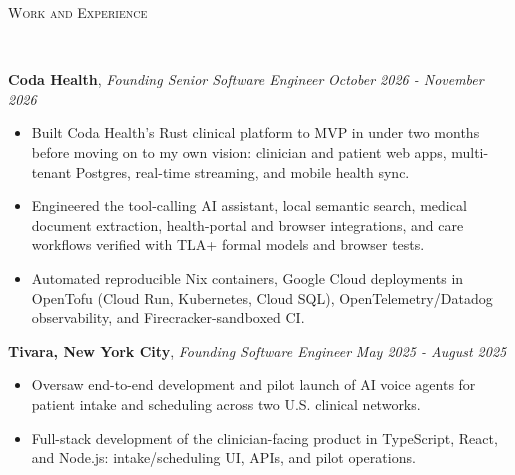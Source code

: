 \documentclass[8pt]{article}
\newenvironment{changemargin}[2]{%
  \begin{list}{}{%
    \setlength{\topsep}{0pt}%
    \setlength{\leftmargin}{#1}%
    \setlength{\rightmargin}{#2}%
    \setlength{\listparindent}{\parindent}%
    \setlength{\itemindent}{\parindent}%
    \setlength{\parsep}{0pt}%
    \setlength{\itemsep}{-2pt}%
  }%
  \item[]}{\end{list}
}
\newcommand{\lineover}{
	\begin{changemargin}{-0.05in}{-0.05in}
		\vspace*{-10pt}
		\hrulefill \\
		\vspace*{-4pt}
	\end{changemargin}
}
\newcommand{\header}[1]{
	\begin{changemargin}{-0.5in}{-0.5in}
		\scshape{#1}\\
  	\lineover
	\end{changemargin}
}
\newenvironment{body} {
	\vspace*{-10pt}
	\begin{changemargin}{-0.25in}{-0.5in}
  }	
	{\end{changemargin}
}
\begin{document}
\header{Work and Experience}
\begin{body}
	\vspace{8pt} %

	\textbf{Coda Health}, \emph{Founding Senior Software Engineer} \hfill \emph{October 2026 - November 2026}\\
	\vspace*{-6pt}
	\begin{itemize} \itemsep -2pt
		\item Built Coda Health's Rust clinical platform to MVP in under two months before moving on to my own vision: clinician and patient web apps, multi-tenant Postgres, real-time streaming, and mobile health sync.
		\item Engineered the tool-calling AI assistant, local semantic search, medical document extraction, health-portal and browser integrations, and care workflows verified with TLA+ formal models and browser tests.
		\item Automated reproducible Nix containers, Google Cloud deployments in OpenTofu (Cloud Run, Kubernetes, Cloud SQL), OpenTelemetry/Datadog observability, and Firecracker-sandboxed CI.
	\end{itemize}
	\vspace*{-6pt}

	\textbf{Tivara, New York City}, \emph{Founding Software Engineer} \hfill \emph{May 2025 - August 2025}\\
	\vspace*{-6pt}
	\begin{itemize} \itemsep -2pt
		\item Oversaw end-to-end development and pilot launch of AI voice agents for patient intake and scheduling across two U.S. clinical networks.
		\item Full-stack development of the clinician-facing product in TypeScript, React, and Node.js: intake/scheduling UI, APIs, and pilot operations.
	\end{itemize}
	\vspace*{-6pt}


\end{body}
\end{document}
